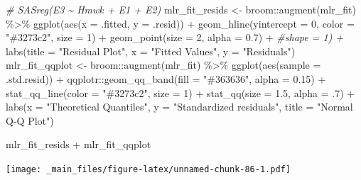 \documentclass[
]{book}
\newenvironment{Shaded}{\begin{snugshade}}{\end{snugshade}}
\newcommand{\AttributeTok}[1]{\textcolor[rgb]{0.77,0.63,0.00}{#1}}
\newcommand{\CommentTok}[1]{\textcolor[rgb]{0.56,0.35,0.01}{\textit{#1}}}
\newcommand{\DecValTok}[1]{\textcolor[rgb]{0.00,0.00,0.81}{#1}}
\newcommand{\FloatTok}[1]{\textcolor[rgb]{0.00,0.00,0.81}{#1}}
\newcommand{\FunctionTok}[1]{\textcolor[rgb]{0.00,0.00,0.00}{#1}}
\newcommand{\NormalTok}[1]{#1}
\newcommand{\OtherTok}[1]{\textcolor[rgb]{0.56,0.35,0.01}{#1}}
\newcommand{\SpecialCharTok}[1]{\textcolor[rgb]{0.00,0.00,0.00}{#1}}
\newcommand{\StringTok}[1]{\textcolor[rgb]{0.31,0.60,0.02}{#1}}
\begin{document}
\begin{Shaded}
\begin{Highlighting}[]
\CommentTok{\# SASreg(E3 \textasciitilde{} Hmwk + E1 + E2)}
\NormalTok{mlr\_fit\_resids }\OtherTok{\textless{}{-}}\NormalTok{ broom}\SpecialCharTok{::}\FunctionTok{augment}\NormalTok{(mlr\_fit) }\SpecialCharTok{\%\textgreater{}\%} 
  \FunctionTok{ggplot}\NormalTok{(}\FunctionTok{aes}\NormalTok{(}\AttributeTok{x =}\NormalTok{ .fitted, }\AttributeTok{y =}\NormalTok{ .resid)) }\SpecialCharTok{+} 
  \FunctionTok{geom\_hline}\NormalTok{(}\AttributeTok{yintercept =} \DecValTok{0}\NormalTok{, }\AttributeTok{color =} \StringTok{"\#3273c2"}\NormalTok{, }\AttributeTok{size =} \DecValTok{1}\NormalTok{) }\SpecialCharTok{+}
  \FunctionTok{geom\_point}\NormalTok{(}\AttributeTok{size =} \DecValTok{2}\NormalTok{, }\AttributeTok{alpha =} \FloatTok{0.7}\NormalTok{) }\SpecialCharTok{+} \CommentTok{\#shape = 1) +}
  \FunctionTok{labs}\NormalTok{(}\AttributeTok{title =} \StringTok{"Residual Plot"}\NormalTok{, }
       \AttributeTok{x =} \StringTok{"Fitted Values"}\NormalTok{, }
       \AttributeTok{y =} \StringTok{"Residuals"}\NormalTok{)}
\NormalTok{mlr\_fit\_qqplot }\OtherTok{\textless{}{-}}\NormalTok{ broom}\SpecialCharTok{::}\FunctionTok{augment}\NormalTok{(mlr\_fit) }\SpecialCharTok{\%\textgreater{}\%} 
  \FunctionTok{ggplot}\NormalTok{(}\FunctionTok{aes}\NormalTok{(}\AttributeTok{sample =}\NormalTok{ .std.resid)) }\SpecialCharTok{+}
\NormalTok{  qqplotr}\SpecialCharTok{::}\FunctionTok{geom\_qq\_band}\NormalTok{(}\AttributeTok{fill =} \StringTok{"\#363636"}\NormalTok{, }\AttributeTok{alpha =} \FloatTok{0.15}\NormalTok{) }\SpecialCharTok{+}
  \FunctionTok{stat\_qq\_line}\NormalTok{(}\AttributeTok{color =} \StringTok{"\#3273c2"}\NormalTok{, }\AttributeTok{size =} \DecValTok{1}\NormalTok{) }\SpecialCharTok{+}
  \FunctionTok{stat\_qq}\NormalTok{(}\AttributeTok{size =} \FloatTok{1.5}\NormalTok{, }\AttributeTok{alpha =}\NormalTok{ .}\DecValTok{7}\NormalTok{) }\SpecialCharTok{+}
  \FunctionTok{labs}\NormalTok{(}\AttributeTok{x =} \StringTok{"Theoretical Quantiles"}\NormalTok{,}
       \AttributeTok{y =} \StringTok{"Standardized residuals"}\NormalTok{,}
       \AttributeTok{title =} \StringTok{"Normal Q{-}Q Plot"}\NormalTok{)}

\NormalTok{mlr\_fit\_resids }\SpecialCharTok{+}\NormalTok{ mlr\_fit\_qqplot}
\end{Highlighting}
\end{Shaded}

\texttt{[image: \_main\_files/figure-latex/unnamed-chunk-86-1.pdf]}
\end{document}
